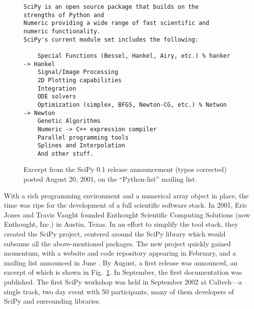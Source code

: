 \documentclass[fleqn,10pt]{wlscirep}
\begin{document}
\begin{figure}
\begin{verbatim}
SciPy is an open source package that builds on the strengths of Python and
Numeric providing a wide range of fast scientific and numeric functionality.
SciPy's current module set includes the following:

    Special Functions (Bessel, Hankel, Airy, etc.) % hanker -> Hankel
    Signal/Image Processing
    2D Plotting capabilities
    Integration
    ODE solvers
    Optimization (simplex, BFGS, Newton-CG, etc.) % Netwon -> Newton
    Genetic Algorithms
    Numeric -> C++ expression compiler
    Parallel programming tools
    Splines and Interpolation
    And other stuff.
\end{verbatim}
\caption{Excerpt from the SciPy 0.1 release announcement (typos corrected) posted August 20, 2001, on the ``Python-list'' mailing list\cite{first-scipy-rel}.}\label{fig:announce-0.1}
\end{figure}

With a rich programming environment and a numerical array object in
place, the time was ripe for the development of a full scientific
software stack.
In 2001, Eric Jones and Travis Vaught founded Enthought Scientific
Computing Solutions (now Enthought, Inc.) in Austin, Texas.  In an
effort to simplify the tool stack, they created the SciPy project,
centered around the SciPy library which would subsume all the
above-mentioned packages.
The new project quickly gained momentum, with a website and code
repository appearing in
February\cite{archived-scipyorg}, and
a mailing list announced in
June \cite{new-scipy-list}. By
August, a first release was announced\cite{first-scipy-rel}, an excerpt of which is shown in
Fig.~\ref{fig:announce-0.1}.
In September, the first documentation was
published\cite{first-scipy-docs}.
The first SciPy
workshop\cite{first-scipy-workshop}
was held in September 2002 at Caltech---a single track, two day event with 50
participants, many of them developers of SciPy and surrounding libraries.


\end{document}
